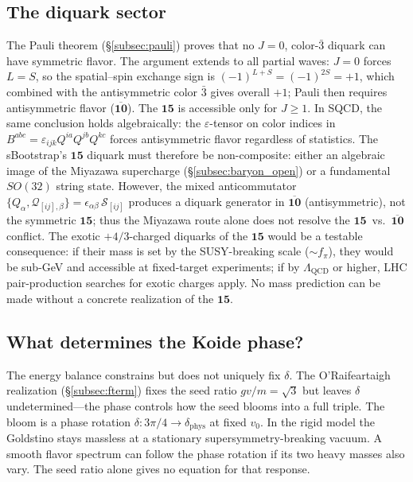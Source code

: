 \documentclass[12pt,a4paper]{article}
\begin{document}
\subsection{The diquark sector}
The Pauli theorem (\S\ref{subsec:pauli}) proves that no $J=0$,
color-$\bar{3}$ diquark can have symmetric flavor.  The argument
extends to all partial waves: $J = 0$ forces $L = S$, so the
spatial--spin exchange sign is $(-1)^{L+S} = (-1)^{2S} = +1$,
which combined with the antisymmetric color $\bar{3}$ gives
overall $+1$; Pauli then requires antisymmetric flavor
($\overline{\mathbf{10}}$).  The $\mathbf{15}$ is accessible
only for $J \geq 1$.  In SQCD, the same conclusion holds
algebraically: the $\varepsilon$-tensor on color indices in
$B^{abc} = \varepsilon_{ijk}Q^{ia}Q^{jb}Q^{kc}$ forces
antisymmetric flavor regardless of statistics.
The sBootstrap's $\mathbf{15}$ diquark must therefore be non-composite:
either an algebraic image of the Miyazawa supercharge
(\S\ref{subsec:baryon_open}) or a fundamental $SO(32)$ string state.
However, the mixed anticommutator
$\{Q_\alpha, \mathcal{Q}_{[ij],\beta}\} = \epsilon_{\alpha\beta}\,
\mathcal{S}_{[ij]}$ produces a diquark generator in
$\overline{\mathbf{10}}$ (antisymmetric), not the symmetric
$\mathbf{15}$; thus the Miyazawa route alone does not resolve the
$\mathbf{15}$~vs.~$\overline{\mathbf{10}}$ conflict.
The exotic $+4/3$-charged
diquarks of the $\mathbf{15}$ would be a testable consequence:
if their mass is set by the SUSY-breaking scale ($\sim f_\pi$), they
would be sub-GeV and accessible at fixed-target experiments; if by
$\Lambda_{\text{QCD}}$ or higher, LHC pair-production searches for
exotic charges apply. No mass prediction can be made without a
concrete realization of the $\mathbf{15}$.

\subsection{What determines the Koide phase?}
The energy balance constrains but does not uniquely fix $\delta$.
The O'Raifeartaigh realization (\S\ref{subsec:fterm}) fixes the
seed ratio $gv/m = \sqrt{3}$ but leaves $\delta$ undetermined---the
phase controls how the seed blooms into a full triple. The bloom
is a phase rotation $\delta: 3\pi/4 \to \delta_{\text{phys}}$ at
fixed $v_0$. In the rigid model the Goldstino stays massless at a
stationary supersymmetry-breaking vacuum. A smooth flavor spectrum
can follow the phase rotation if its two heavy masses also vary.
The seed ratio alone gives no equation for that response.
\end{document}

